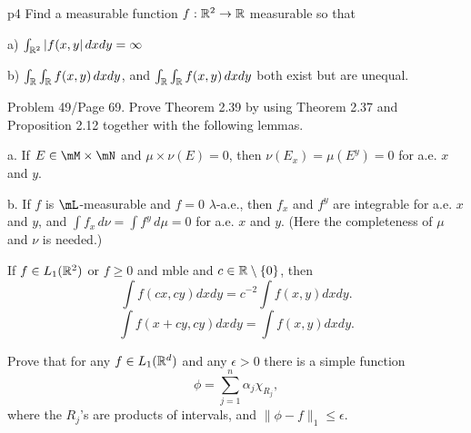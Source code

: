 \documentclass{article}
\begin{document}
 p{4} Find a measurable function $f: \mathbb{R}^2 \to \mathbb{R}$ measurable so that

a) $\int_{\mathbb{R}^2} |f(x,y| \, dx dy = \infty$

b) $\int_{\mathbb{R}} \int _{\mathbb{R}} f(x,y) \, dx dy$, and $\int_{\mathbb{R}} \int_{\mathbb{R}} f(x,y) \, dx dy$ both exist but are unequal.

 Problem 49/Page 69. Prove Theorem 2.39 by using Theorem 2.37 and Proposition 2.12 together with the following lemmas.

a. If $E \in \mM \times \mN$ and $\mu \times \nu(E) = 0$, then $\nu(E_x) = \mu(E^y) = 0$ for a.e. $x$ and $y$.

b. If $f$ is $\mL$-measurable and $f = 0$ $\lambda$-a.e., then $f_x$ and $f^y$ are integrable for a.e. $x$ and $y$, and $\int f_x \, d\nu = \int f^y \, d\mu = 0$ for a.e. $x$ and $y$. (Here the completeness of $\mu$ and $\nu$ is needed.)

 If $f \in L_1(\mathbb{R}^2)$ or $f \ge 0$ and mble and $c \in \mathbb{R} \setminus \{0\}$, then
$$ \int f (cx, cy) dx dy  =  c^{-2} \int f(x,y) dx dy.$$
$$\int f (x + cy, cy) dx dy  =  \int f(x,y) dx dy.$$

 Prove that for any $f \in L_1(\mathbb{R}^d)$ and any $\epsilon > 0$ there is a simple function
$$ \phi = \sum_{j=1}^n \alpha_j \chi_{R_j},$$
where the $R_j$'s are products of intervals, and $\|\phi - f\|_1 \le \epsilon$.
\end{document}
